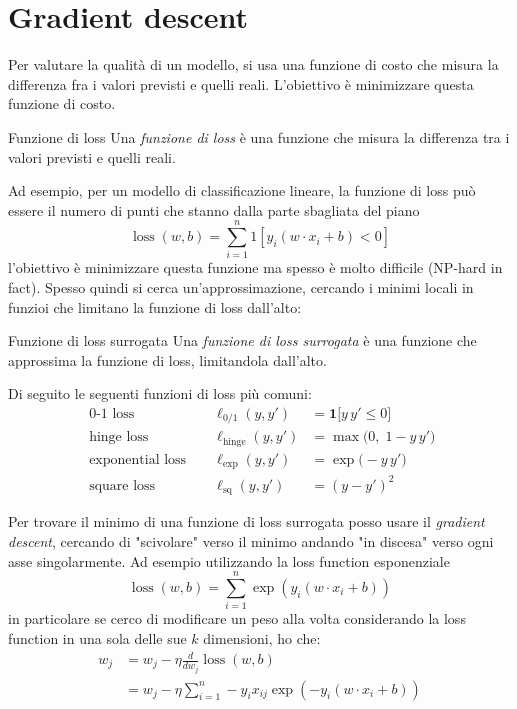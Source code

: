 \section{Gradient descent}
Per valutare la qualità di un modello, si usa una funzione di costo che misura la differenza fra i valori previsti e quelli reali. L'obiettivo è minimizzare questa funzione di costo.
\begin{definizione}{Funzione di loss}
	Una \textit{funzione di loss} è una funzione che misura la differenza tra i valori previsti e quelli reali.
\end{definizione}
Ad esempio, per un modello di classificazione lineare, la funzione di loss può essere il numero di punti che stanno dalla parte sbagliata del piano
\[
	\operatorname{loss}\left(w, b\right) = \sum_{i=1}^{n} 1\left[y_i \left(w\cdot x_i + b\right) < 0\right]
\]
l'obiettivo è minimizzare questa funzione ma spesso è molto difficile (NP-hard in fact). Spesso quindi si cerca un'approssimazione, cercando i minimi locali in funzioi che limitano la funzione di loss dall'alto:

\begin{definizione}{Funzione di loss surrogata}
	Una \textit{funzione di loss surrogata} è una funzione che approssima la funzione di loss, limitandola dall'alto.
\end{definizione}
Di seguito le seguenti funzioni di loss più comuni:
\begin{align*}
	\text{ 0-1 loss }         &  & \ell_{0/1}(y, y')            & = \mathbf{1}\bigl[y\,y' \le 0\bigr] \\
	\text{ hinge loss }       &  & \ell_{\mathrm{hinge}}(y, y') & = \max\bigl(0,\;1 - y\,y'\bigr)     \\
	\text{ exponential loss } &  & \ell_{\exp}(y, y')           & = \exp\bigl(-y\,y'\bigr)            \\
	\text{ square loss }      &  & \ell_{\mathrm{sq}}(y, y')    & = (y - y')^2
\end{align*}

Per trovare il minimo di una funzione di loss surrogata posso usare il \textit{gradient descent}, cercando di "scivolare" verso il minimo andando "in discesa" verso ogni asse singolarmente. Ad esempio utilizzando la loss function esponenziale
\[
	\operatorname{loss}\left(w, b\right) = \sum_{i=1}^{n} \exp \left(y_i \left(w\cdot x_i + b\right)\right)
\]
in particolare se cerco di modificare un peso alla volta considerando la loss function in una sola delle sue $ k $ dimensioni, ho che:
\begin{align*}
	w_j & = w_j - \eta \frac{d}{d w_j} \operatorname{loss}\left(w, b\right)            \\
	    & = w_j -\eta \sum_{i=1}^n -y_i x_{ij} \exp \left(-y_i (w\cdot x_i + b)\right)
\end{align*}

